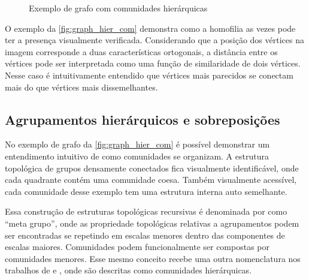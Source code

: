 \documentclass[notes.tex]{subfiles}
\begin{document}
\begin{figure}[htpb]
    \centering
    \caption{Exemplo de grafo com comunidades hierárquicas}\label{fig:graph_hier_com}
\end{figure}

O exemplo da \autoref{fig:graph_hier_com} demonstra como a homofilia as vezes pode ter a presença visualmente verificada.
Considerando que a posição dos vértices na imagem corresponde a duas características ortogonais, a distância entre os vértices pode ser interpretada como uma função de similaridade de dois vértices.
Nesse caso é intuitivamente entendido que vértices mais parecidos se conectam mais do que vértices mais dissemelhantes.

\subsection{Agrupamentos hierárquicos e sobreposições}

No exemplo de grafo da \autoref{fig:graph_hier_com} é possível demonstrar um entendimento intuitivo de como comunidades se organizam.
A estrutura topológica de grupos densamente conectados fica visualmente identificável, onde cada quadrante contém uma comunidade coesa.
Também visualmente acessível, cada comunidade desse exemplo tem uma estrutura interna auto semelhante.

Essa construção de estruturas topológicas recursivas é denominada por  como ``meta grupo'', onde as propriedade topológicas relativas a agrupamentos podem ser encontradas se repetindo em escalas menores dentro das componentes de escalas maiores.
Comunidades podem funcionalmente ser compostas por comunidades menores.
Esse mesmo conceito recebe uma outra nomenclatura nos trabalhos de  e , onde são descritas como comunidades hierárquicas.
\end{document}
